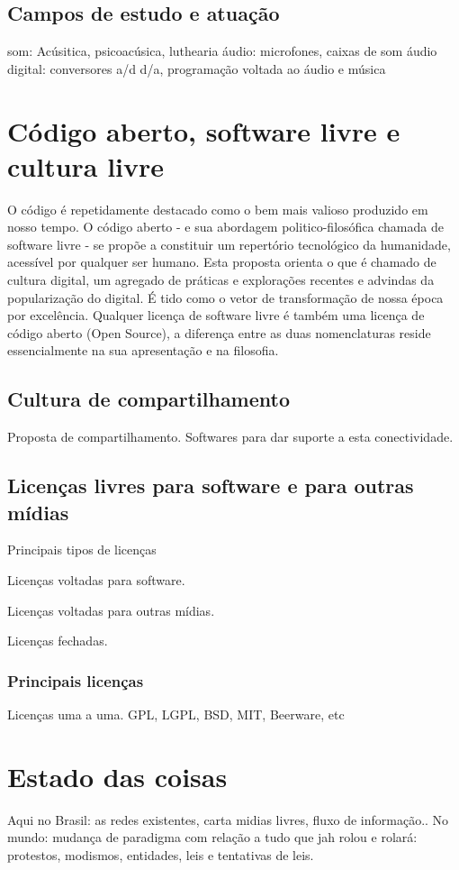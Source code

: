   \subsection{Campos de estudo e atuação}
som: Acúsitica, psicoacúsica, luthearia
áudio: microfones, caixas de som
áudio digital: conversores a/d d/a, programação voltada ao áudio e música


\section{Código aberto, software livre e cultura livre}
O código é repetidamente destacado como o bem mais valioso produzido em nosso tempo.
O código aberto - e sua abordagem politico-filosófica chamada de software livre -
se propõe a constituir um repertório tecnológico da humanidade, acessível por
qualquer ser humano. Esta proposta orienta o que é chamado de cultura digital,
um agregado de práticas e explorações recentes e advindas da popularização do digital.
É tido como o vetor de transformação de nossa época por excelência.
Qualquer licença de software livre é também uma licença de código aberto
(Open Source), a diferença entre as duas nomenclaturas reside essencialmente
na sua apresentação e na filosofia.


  \subsection{Cultura de compartilhamento}
  \label{sec:soft_compar}
Proposta de compartilhamento. Softwares para dar suporte a esta conectividade.


  \subsection{Licenças livres para software e para outras mídias}
  \label{sec:licencas_livres}
Principais tipos de licenças

Licenças voltadas para software.

Licenças voltadas para outras mídias.

Licenças fechadas.

  \subsubsection{Principais licenças}
  \label{sec:princ_licencas}
Licenças uma a uma. GPL, LGPL, BSD, MIT, Beerware, etc


\section{Estado das coisas}
\label{sec:context}
Aqui no Brasil: as redes existentes, carta midias livres, fluxo de informação..
No mundo: mudança de paradigma com relação a tudo que jah rolou e rolará:
protestos, modismos, entidades, leis e tentativas de leis.

